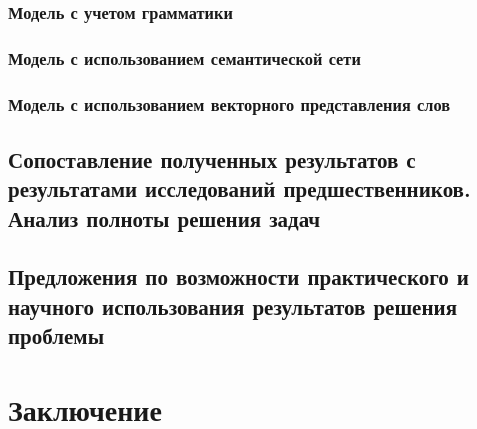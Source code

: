 \documentclass[a4paper,14pt,oneside,openany]{memoir}
\begin{document}
\subsection{Модель с учетом грамматики}

\subsection{Модель с использованием семантической сети}

\subsection{Модель с использованием векторного представления слов}

\section{Сопоставление полученных результатов с результатами исследований предшественников.
Анализ полноты решения задач}

\section{Предложения по возможности практического и научного использования результатов решения проблемы}

\chapter*{Заключение}

\printbibliography[title={Список использованных источников},category=cited]
\printbibliography[title={Непроцитированные источники (должно быть пусто)},notcategory=cited]
\end{document}
